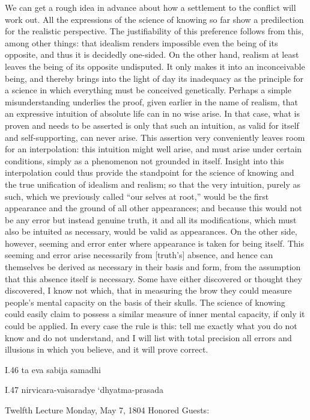 We can get a rough idea in advance about
how a settlement to the conflict will work out.
All the expressions of the science of knowing so far
show a predilection for the realistic perspective.
The justifiability of this preference follows
from this, among other things:
that idealism renders impossible
even the being of its opposite,
and thus it is decidedly one-sided.
On the other hand, realism at least leaves
the being of its opposite undisputed.
It only makes it into an inconceivable being,
and thereby brings into the light of day
its inadequacy as the principle for a science
in which everything must be conceived genetically.
Perhaps a simple misunderstanding underlies the proof,
given earlier in the name of realism,
that an expressive intuition of
absolute life can in no wise arise.
In that case, what is proven
and needs to be asserted is only that
such an intuition,
as valid for itself and self-supporting,
can never arise.
This assertion very conveniently
leaves room for an interpolation:
this intuition might well arise,
and must arise under certain conditions,
simply as a phenomenon not grounded in itself.
Insight into this interpolation could thus provide
the standpoint for the science of knowing
and the true unification of idealism and realism;
so that the very intuition, purely as such,
which we previously called “our selves at root,”
would be the first appearance
and the ground of all other appearances;
and because this would not be any error
but instead genuine truth,
it and all its modifications,
which must also be intuited as necessary,
would be valid as appearances.
On the other side, however, seeming and error
enter where appearance is taken for being itself.
This seeming and error arise necessarily from [truth’s] absence,
and hence can themselves be derived
as necessary in their basis and form,
from the assumption that this absence itself is necessary.
Some have either discovered or thought they discovered,
I know not which, that in measuring the brow
they could measure people’s mental capacity
on the basis of their skulls.
The science of knowing could easily claim
to possess a similar measure of inner mental capacity,
if only it could be applied.
In every case the rule is this:
tell me exactly what you do not know
and do not understand,
and I will list with total precision
all errors and illusions in which you believe,
and it will prove correct.

I.46
ta eva sabija samadhi

I.47
nirvicara-vaisaradye ‘dhyatma-prasada

Twelfth Lecture
Monday, May 7, 1804
Honored Guests:

